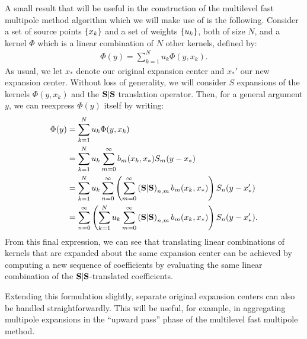 A small result that will be useful in the construction of the
multilevel fast multipole method algorithm which we will make use of
is the following. Consider a set of source points $\left\{x_k\right\}$
and a set of weights $\left\{u_k\right\}$,
both of size $N$,
and a kernel $\Phi$
which is a linear combination of $N$ other kernels, defined by:
\begin{align*}
  \Phi(y) = \sum_{k=1}^N u_k \Phi(y, x_k).
\end{align*}
As usual, we let $x_*$
denote our original expansion center and $x_*'$
our new expansion center. Without loss of generality, we will consider
$S$
expansions of the kernels $\Phi(y, x_k)$
and the $\bold{S}|\bold{S}$
translation operator. Then, for a general argument $y$,
we can reexpress $\Phi(y)$ itself by writing:
\begin{align*}
  \Phi(y)
  &= \sum_{k=1}^N u_k \Phi(y, x_k) \\
  &= \sum_{k=1}^N u_k \sum_{m=0}^\infty b_m(x_k, x_*) S_m(y - x_*) \\
  &= \sum_{k=1}^N u_k \sum_{n=0}^\infty \left(\sum_{m=0}^\infty \left(\bold{S}|\bold{S}\right)_{n,m} b_m(x_k, x_*)\right) S_n(y - x_*') \\
  &= \sum_{n=0}^\infty \left(\sum_{k=1}^N u_k \sum_{m=0}^\infty \left(\bold{S}|\bold{S}\right)_{n,m} b_m(x_k, x_*)\right) S_n(y - x_*').
\end{align*}
From this final expression, we can see that translating linear
combinations of kernels that are expanded about the same expansion
center can be achieved by computing a new sequence of coefficients by
evaluating the same linear combination of the $\bold{S}|\bold{S}$-translated
coefficients. 

Extending this formulation slightly, separate original expansion
centers can also be handled straightforwardly. This will be useful,
for example, in aggregating multipole expansions in the ``upward
pass'' phase of the multilevel fast multipole method.
